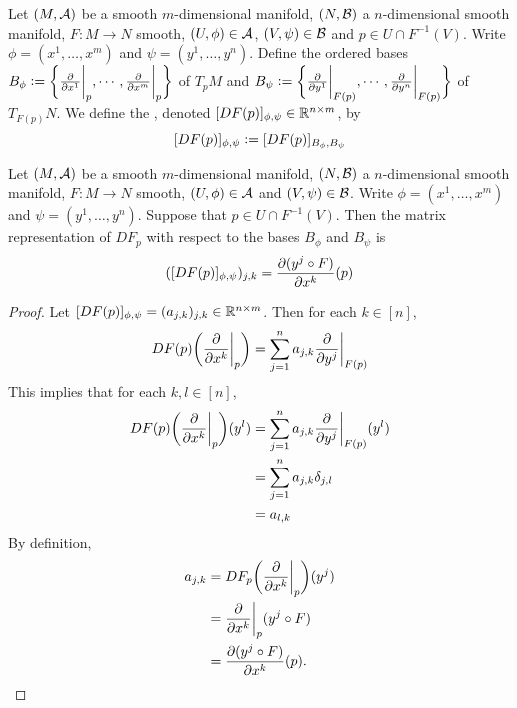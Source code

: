 \documentclass{book}
\begin{document}
	\begin{defn}
		Let $(M, \mathcal{A})$ be a smooth $m$-dimensional manifold, $(N, \mathcal{B})$ a $n$-dimensional smooth manifold, $F: M \rightarrow N$ smooth, $(U, \phi) \in \mathcal{A}$, $(V, \psi) \in \mathcal{B}$ and $p \in U \cap F^{-1}(V)$. Write $\phi = (x^1, \dots, x^m)$ and $\psi = (y^1, \dots, y^n)$. Define the ordered bases $B_\phi \vcentcolon= \bigg \{\frac{\partial}{\partial x^1} \bigg|_p, \cdots, \frac{\partial}{\partial x^m} \bigg|_p \bigg \}$ of $T_pM$ and $B_{\psi} \vcentcolon= \bigg \{\frac{\partial}{\partial y^1} \bigg|_{F(p)}, \cdots, \frac{\partial}{\partial y^n} \bigg|_{F(p)} \bigg \}$ of $T_{F(p)}N$. We define the , denoted $[DF(p)]_{\phi, \psi} \in \mathbb{R}^{n \times m}$, by 
		$$[DF(p)]_{\phi, \psi} \vcentcolon= [DF(p)]_{B_{\phi}, B_{\psi}}$$
	\end{defn}

	\begin{ex}
		Let $(M, \mathcal{A})$ be a smooth $m$-dimensional manifold, $(N, \mathcal{B})$ a $n$-dimensional smooth manifold, $F: M \rightarrow N$ smooth, $(U, \phi) \in \mathcal{A}$ and $(V, \psi) \in \mathcal{B}$. Write $\phi = (x^1, \dots, x^m)$ and $\psi = (y^1, \dots, y^n)$. Suppose that $p \in U \cap F^{-1}(V)$.
		Then the matrix representation of $DF_p$ with respect to the bases
		$B_{\phi}$ and $B_{\psi}$ is $$ ([DF(p)]_{\phi, \psi})_{j, k} =  \frac{\partial (y^j \circ F)}{\partial x^k}(p)$$
	\end{ex}

	\begin{proof}
		Let $[DF(p)]_{\phi, \psi} = (a_{j,k})_{j,k} \in \mathbb{R}^{n \times m}$. Then for each $k \in [n]$, $$DF(p) \bigg(\frac{\partial }{\partial x^k} \bigg|_p\bigg) = \sum_{j=1}^n a_{j,k}\frac{\partial }{\partial y^j} \bigg|_{F(p)}$$
		This implies that for each $k, l \in [n]$,
		\begin{align*}
			DF(p) \bigg(\frac{\partial }{\partial x^k} \bigg|_p \bigg) (y^l )
			&=  \sum_{j=1}^n a_{j,k}\frac{\partial }{\partial y^j} \bigg|_{F(p)} (y^l) \\
			&= \sum_{j=1}^n a_{j,k} \delta_{j,l} \\
			&= a_{l, k}
		\end{align*}
		By definition, 
		\begin{align*}
			a_{j,k}
			& = DF_p \bigg(\frac{\partial }{\partial x^k} \bigg|_p\bigg) (y^j) \\
			&=  \frac{\partial }{\partial x^k} \bigg|_p (y^j \circ F) \\
			&= \frac{\partial (y^j \circ F)}{\partial x^k} (p).
		\end{align*}
	\end{proof}
	
\end{document}
